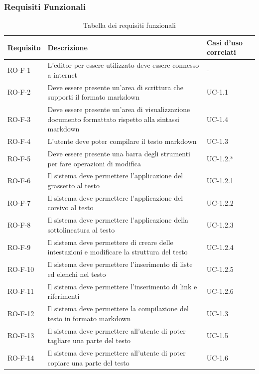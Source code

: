 \documentclass[11pt,a4paper]{article}
\begin{document}
\subsubsection{Requisiti Funzionali}
\begin{longtable}{|p{}|>{\raggedright\arraybackslash}p{}|p{}|}

\caption{Tabella dei requisiti funzionali}\\
\hline
\textbf{Requisito} & \textbf{Descrizione} & \textbf{Casi d'uso correlati}\\
\hline
\endhead
RO-F-1 & L'editor per essere utilizzato deve essere connesso a internet & - \\
\hline
RO-F-2 & Deve essere presente un'area di scrittura che supporti il formato markdown & UC-1.1 \\
\hline
RO-F-3 & Deve essere presente un'area di visualizzazione documento formattato rispetto alla sintassi markdown & UC-1.4 \\
\hline
RO-F-4 & L'utente deve poter compilare il testo markdown & UC-1.3 \\
\hline
RO-F-5 & Deve essere presente una barra degli strumenti per fare operazioni di modifica & UC-1.2.* \\
\hline
RO-F-6 & Il sistema deve permettere l'applicazione del grassetto al testo & UC-1.2.1 \\
\hline
RO-F-7 & Il sistema deve permettere l'applicazione del corsivo al testo & UC-1.2.2 \\
\hline
RO-F-8 & Il sistema deve permettere l'applicazione della sottolineatura al testo & UC-1.2.3 \\
\hline
RO-F-9 & Il sistema deve permettere di creare delle intestazioni e modificare la struttura del testo & UC-1.2.4 \\
\hline
RO-F-10 & Il sistema deve permettere l'inserimento di liste ed elenchi nel testo & UC-1.2.5 \\
\hline
RO-F-11 & Il sistema deve permettere l'inserimento di link e riferimenti & UC-1.2.6 \\
\hline
RO-F-12 & Il sistema deve permettere la compilazione del testo in formato markdown & UC-1.3 \\
\hline
RO-F-13 & Il sistema deve permettere all'utente di poter tagliare una parte del testo & UC-1.5 \\
\hline
RO-F-14 & Il sistema deve permettere all'utente di poter copiare una parte del testo & UC-1.6 \\

\end{longtable}
\end{document}
